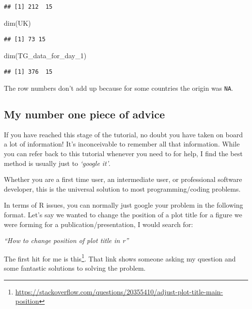 \documentclass[
]{book}
\newenvironment{Shaded}{\begin{snugshade}}{\end{snugshade}}
\newcommand{\FunctionTok}[1]{\textcolor[rgb]{0.00,0.00,0.00}{#1}}
\newcommand{\NormalTok}[1]{#1}
\renewcommand{\href}[2]{#2\footnote{\url{#1}}}
\begin{document}
\begin{verbatim}
## [1] 212  15
\end{verbatim}

\begin{Shaded}
\begin{Highlighting}[]
\FunctionTok{dim}\NormalTok{(UK)}
\end{Highlighting}
\end{Shaded}

\begin{verbatim}
## [1] 73 15
\end{verbatim}

\begin{Shaded}
\begin{Highlighting}[]
\FunctionTok{dim}\NormalTok{(TG\_data\_for\_day\_1)}
\end{Highlighting}
\end{Shaded}

\begin{verbatim}
## [1] 376  15
\end{verbatim}

The row numbers don't add up because for some countries the origin was \texttt{NA}.

\hypertarget{my-number-one-piece-of-advice}{%
\subsection{My number one piece of advice}\label{my-number-one-piece-of-advice}}

If you have reached this stage of the tutorial, no doubt you have taken on board a lot of information! It's inconceivable to remember all that information. While you can refer back to this tutorial whenever you need to for help, I find the best method is usually just to \emph{`google it'}.

Whether you are a first time user, an intermediate user, or professional software developer, this is the universal solution to most programming/coding problems.

In terms of R issues, you can normally just google your problem in the following format. Let's say we wanted to change the position of a plot title for a figure we were forming for a publication/presentation, I would search for:

\emph{``How to change position of plot title in r''}

The first hit for me is \href{https://stackoverflow.com/questions/20355410/adjust-plot-title-main-position}{this}. That link shows someone asking my question and some fantastic solutions to solving the problem.
\end{document}
